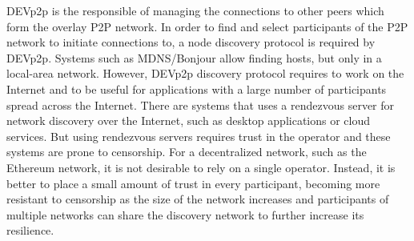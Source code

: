 DEVp2p is the responsible of managing the connections to other peers which form the overlay P2P network.
In order to find and select participants of the P2P network to initiate connections to,  a node discovery protocol is required by DEVp2p.
Systems such as MDNS/Bonjour allow finding hosts,  but only in  a local-area network.  
However, DEVp2p discovery protocol requires to work on the Internet and to be useful for applications with a large number of participants spread across the Internet.
There are systems that uses a rendezvous server for network discovery over the Internet,  such as desktop applications or cloud services. 
But using rendezvous servers requires trust in the operator and these systems are prone to censorship. 
For a decentralized network,  such as the Ethereum network,  it is not desirable to rely on a single operator.  
Instead,  it is better to place a small amount of trust in every participant, becoming more resistant to censorship as the size of the network increases and participants of multiple networks can share the discovery network to further increase its resilience.

